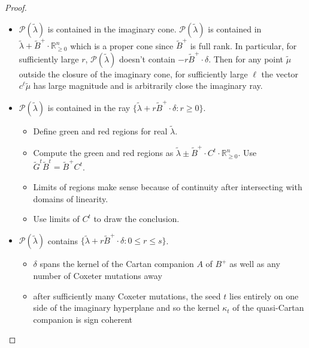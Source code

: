 \documentclass{amsart}
\numberwithin{theorem}{section}
\newcommand{\cP}{\mathcal{P}}
\newcommand{\RR}{\mathbb{R}}
\begin{document}
  \begin{proof}
  $ $
    \begin{itemize}
      \item[\checkmark] $\cP(\widetilde\lambda)$ is contained in the imaginary cone.
        $\cP(\widetilde\lambda)$ is contained in $\widetilde\lambda + \widetilde B^+ \cdot \RR_{\ge0}^n$ which is a proper cone since $\widetilde B^+$ is full rank.
        In particular, for sufficiently large $r$, $\cP(\widetilde\lambda)$ doesn't contain $-r \widetilde B^+\cdot \delta$.
        Then for any point $\widetilde\mu$ outside the closure of the imaginary cone, for sufficiently large $\ell$ the vector $c^\ell \widetilde\mu$ has large magnitude and is arbitrarily close the imaginary ray.
      \item $\cP(\widetilde\lambda)$ is contained in the ray $\{\widetilde\lambda+r\widetilde B^+\cdot\delta:r\ge 0\}$.
        \begin{itemize}
          \item Define green and red regions for real $\widetilde\lambda$.
          \item Compute the green and red regions as $\widetilde\lambda \pm \widetilde B^+\cdot C^t\cdot \RR_{\ge0}^n$.
            Use $\widetilde G^t\widetilde B^t = \widetilde B^+ C^t$.
          \item Limits of regions make sense because of continuity after intersecting with domains of linearity.
          \item Use limits of $C^t$ to draw the conclusion.
        \end{itemize}
      \item[\checkmark] $\cP(\widetilde\lambda)$ contains $\{\widetilde\lambda+r\widetilde B^+\cdot\delta:0\le r\le s\}$.
        \begin{itemize}
          \item $\delta$ spans the kernel of the Cartan companion $A$ of $B^+$ as well as any number of Coxeter mutations away
          \item after sufficiently many Coxeter mutations, the seed $t$ lies entirely on one side of the imaginary hyperplane and so the kernel $\kappa_t$ of the quasi-Cartan companion is sign coherent


\end{itemize}
\end{itemize}
\end{proof}
\end{document}
